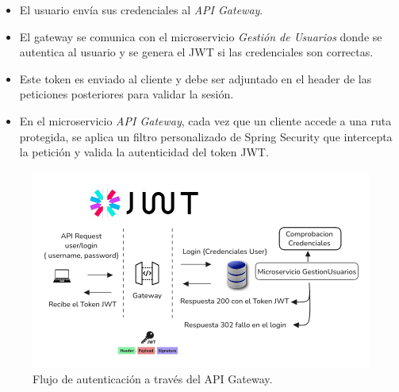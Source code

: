 \begin{itemize}
  \item El usuario envía sus credenciales al \textit{API Gateway}.
  \item El gateway se comunica con el microservicio \textit{Gestión de Usuarios} donde se autentica al usuario y se genera el JWT si las credenciales son correctas.
  \item Este token es enviado al cliente y debe ser adjuntado en el header de las peticiones posteriores para validar la sesión.
  \item En el microservicio \textit{API Gateway}, cada vez que un cliente accede a una ruta protegida, se aplica un filtro personalizado de Spring Security que intercepta la petición y valida la autenticidad del token JWT.
\end{itemize}

\vspace{0.5em}

\begin{figure}[H]
    \centering
    \includegraphics[width=\textwidth]{fotos/jwt_login.png}
    \caption{Flujo de autenticación a través del API Gateway.}
    \label{fig:loginImpl}
\end{figure}


